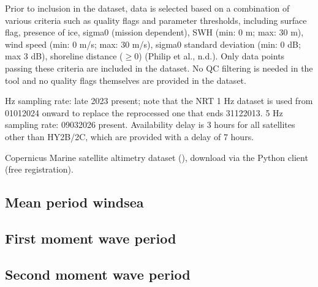 \documentclass[a4paper,10pt,english]{sphinxmanual}
\begin{document}
\sphinxAtStartPar
{}

\sphinxAtStartPar
Prior to inclusion in the dataset, data is selected based on a combination of various criteria such as quality flags and parameter thresholds, including surface flag, presence of ice, sigma0 (mission dependent), SWH (min: 0 m; max: 30 m), wind speed (min: 0 m/s; max: 30 m/s), sigma0 standard deviation (min: 0 dB; max 3 dB), shoreline distance (\(\geq 0\)) (Philip et al., n.d.). Only data points passing these criteria are included in the dataset. No QC filtering is needed in the  tool and no quality flags themselves are provided in the dataset.

\sphinxAtStartPar
{}

 Hz sampling rate: late 2023 \sphinxhyphen{} present; note that the NRT 1 Hz dataset is used from 01\sphinxhyphen{}01\sphinxhyphen{}2024 onward to replace the reprocessed one that ends 31\sphinxhyphen{}12\sphinxhyphen{}2013. 5 Hz sampling rate: 09\sphinxhyphen{}03\sphinxhyphen{}2026 \sphinxhyphen{} present. Availability delay is 3 hours for all satellites other than HY\sphinxhyphen{}2B/2C, which are provided with a delay of 7 hours.

\sphinxAtStartPar
{}

\sphinxAtStartPar
Copernicus Marine satellite altimetry dataset (), download via the  Python client (free registration).


\subsection{Mean period wind\sphinxhyphen{}sea}
\label{\detokenize{05_reference_datasets:mean-period-wind-sea}}

\subsection{First moment wave period}
\label{\detokenize{05_reference_datasets:first-moment-wave-period}}

\subsection{Second moment wave period}
\label{\detokenize{05_reference_datasets:second-moment-wave-period}}
\end{document}
